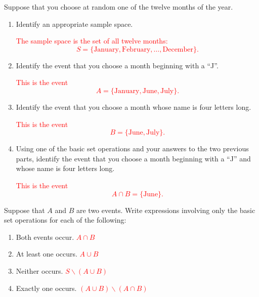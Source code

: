 \documentclass[12pt,reqno]{amsart}
\begin{document}
\bigskip
\prob Suppose that you choose at random one of the twelve months of the year.

\begin{enumerate}
    \item Identify an appropriate sample space.
    
    \bigskip
    \textcolor{red}{The sample space is the set of all twelve months:
        \[S = \{\text{January}, \text{February},\ldots,\text{December}\}.\]}
    \bigskip

    \item Identify the event that you choose a month beginning with a ``J''.
    
    \bigskip
    \textcolor{red}{This is the event
        \[A = \{\text{January}, \text{June}, \text{July} \}.\]}
    \bigskip

    \item Identify the event that you choose a month whose name is four letters long.
    
    \bigskip
    \textcolor{red}{This is the event
        \[B = \{\text{June},\text{July} \}.\]}
    \bigskip

    \item Using one of the basic set operations and your answers to the two previous parts, identify the event that you choose a month beginning with a ``J'' and whose name is four letters long.
    
    \bigskip
    \textcolor{red}{This is the event
        \[A\cap B= \{\text{June}\}.\]}
\end{enumerate}
























\bigskip
\prob Suppose that $A$ and $B$ are two events. Write expressions involving only the basic set operations for each of the following:

\bigskip
\begin{enumerate}
    \item Both events occur. \textcolor{red}{$A\cap B$}
    \item At least one occurs. \textcolor{red}{$A\cup B$}
    \item Neither occurs. \textcolor{red}{$S \smallsetminus (A\cup B)$}
    \item Exactly one occurs. \textcolor{red}{$(A\cup B)\smallsetminus(A\cap B)$}
\end{enumerate}
\end{document}
